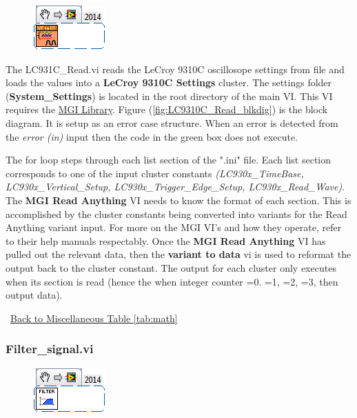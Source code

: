 \documentclass[11pt,a4paper,oldfontcommands]{memoir}
\begin{document}
\begin{figure}[h]
	\includegraphics[scale=0.625]{Waveform-to-XY-Array_main_01}
	\label{fig:Waveform-to-XY-Array_main_01}
\end{figure}

The LC931C\_Read.vi reads the LeCroy 9310C oscillosope settings from file and loads the values into a \textbf{LeCroy 9310C Settings} cluster. The settings folder (\textbf{System\_Settings}) is located in the root directory of the main VI. This VI requires the \href{http://sine.ni.com/nips/cds/view/p/lang/en/nid/209753}{MGI Library}. Figure (\ref{fig:LC9310C_Read_blkdig}) is the block diagram.  It is setup as an error case structure. When an error is detected from the \textit{error (in)} input then the code in the green box does not execute.

The for loop steps through each list section of the ".ini" file. Each list section corresponds to one of the input cluster constants \textit{(LC930x\_TimeBase, LC930x\_Vertical\_Setup, LC930x\_Trigger\_Edge\_Setup, LC930x\_Read\_Wave)}. The \textbf{MGI Read Anything} VI needs to know the format of each section. This is accomplished by the cluster constants being converted into variants for the Read Anything variant input.  For more on the MGI VI's and how they operate, refer to their help manuals respectably. Once the \textbf{MGI Read Anything} VI has pulled out the relevant data, then the \textbf{variant to data} vi is used to reformat the output back to the cluster constant. The output for each cluster only executes when its section is read (hence the when integer counter =0. =1, =2, =3, then output data).

\noindent\hrulefill\, \hyperref[tab:math]{Back to Miscellaneous Table \ref{tab:math}}

\subsubsection{Filter\_signal.vi} \label{Filter_signal}
\noindent\hrulefill

\begin{figure}[h]
	\includegraphics[scale=0.625]{Filter_signal_main_01}
	\label{fig:Filter_signal_main_01}
\end{figure}
\end{document}
